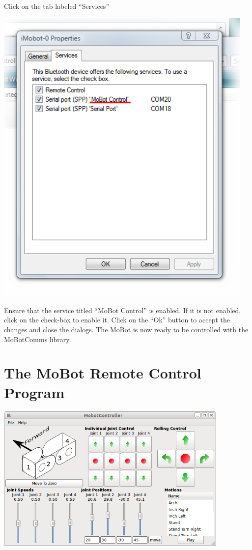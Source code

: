 \documentclass{article}
\begin{document}
Click on the tab labeled ``Services''

\begin{center}
\includegraphics[width=5in]{images/imobot_connect_8.png}
\end{center}

Ensure that the service titled ``MoBot Control'' is enabled. If it is not
enabled, click on the check-box to enable it. Click on the ``Ok'' button to
accept the changes and close the dialogs. The MoBot is now ready to be
controlled with the MoBotComms library.

\section{ The MoBot Remote Control Program }
\includegraphics[width=4.5in]{images/iMobot_controller_screenshot.png}
\end{document}
